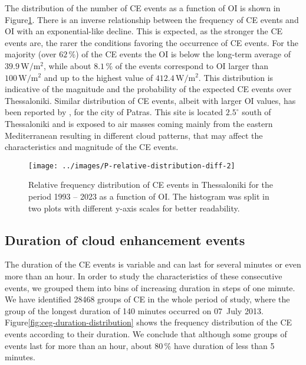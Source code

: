 \documentclass[preprint, 5p,
authoryear]{elsarticle} %
\begin{document}
The distribution of the number of CE events as a function of OI is shown
in Figure\nobreakspace{}\ref{fig:ovir-distribution}. There is an inverse
relationship between the frequency of CE events and OI with an
exponential-like decline. This is expected, as the stronger the CE
events are, the rarer the conditions favoring the occurrence of CE
events. For the majority (over \(62\,\%\)) of the CE events the OI is
below the long-term average of \(39.9\,\text{W}/\text{m}^2\), while
about \(8.1\,\%\) of the events correspond to OI larger than
\(100\,\text{W}/\text{m}^2\) and up to the highest value of
\(412.4\,\text{W}/\text{m}^2\). This distribution is indicative of the
magnitude and the probability of the expected CE events over
Thessaloniki. Similar distribution of CE events, albeit with larger OI
values, has been reported by \citet{Vamvakas2020}, for the city of
Patras. This site is located \(2.5^\circ\) south of Thessaloniki and is
exposed to air masses coming mainly from the eastern Mediterranean
resulting in different cloud patterns, that may affect the
characteristics and magnitude of the CE events.

\begin{figure}

{\centering \texttt{[image: ../images/P-relative-distribution-diff-2]} 

}

\caption{Relative frequency distribution of CE events in Thessaloniki for the period 1993 -- 2023 as a function of OI. The histogram was split in two plots with different y-axis scales for better readability.}\label{fig:ovir-distribution}
\end{figure}

\hypertarget{duration-of-cloud-enhancement-events}{%
\subsection{Duration of cloud enhancement
events}\label{duration-of-cloud-enhancement-events}}

The duration of the CE events is variable and can last for several
minutes or even more than an hour. In order to study the characteristics
of these consecutive events, we grouped them into bins of increasing
duration in steps of one minute. We have identified 28468 groups of CE
in the whole period of study, where the group of the longest duration of
140 minutes occurred on 07~July 2013.
Figure\nobreakspace{}\ref{fig:ceg-duration-distribution} shows the
frequency distribution of the CE events according to their duration. We
conclude that although some groups of events last for more than an hour,
about \(80\,\%\) have duration of less than 5 minutes.
\end{document}

